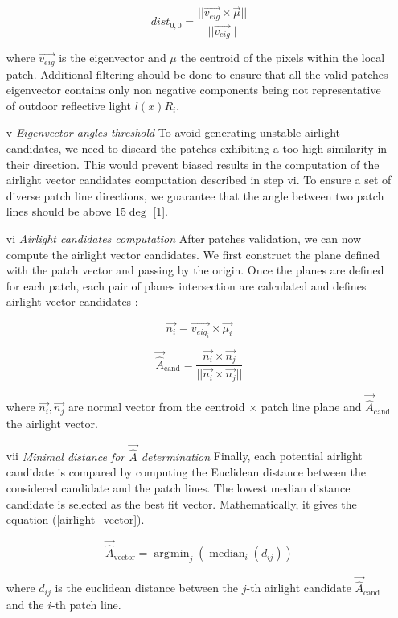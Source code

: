 \documentclass[conference]{IEEEtran}
\DeclareMathOperator*{\argmin}{\arg\!\min}
\begin{document}
\begin{itemize}[]
\begin{equation}
\label{Distance to origin}
dist_{0,0} = \frac{||\vec{v_{eig}} \times \vec{\mu}||}{||\vec{v_{eig}}||}
\end{equation}

where $\vec{v_{eig}}$ is the eigenvector and $\mu$ the centroid of the pixels within the local patch.
Additional filtering should be done to ensure that all the valid patches eigenvector contains only non negative components being 
not representative of outdoor reflective light $l(x)R_i$.

\item[v] \textit{Eigenvector angles threshold} To avoid generating unstable airlight candidates, we need to discard the patches 
exhibiting a too high similarity in their direction. This would prevent biased results in the computation of the airlight vector
 candidates computation described in step vi.  To ensure a set of diverse patch line directions, we guarantee that the angle between two patch lines 
should be above $15 \deg$ [1].
\item[vi] \textit{Airlight candidates computation}  After patches validation, we can now compute the airlight vector candidates.
We first construct the plane defined with the patch vector and passing by the origin.  Once the planes are defined for each patch, each pair of planes 
 intersection are calculated and defines airlight vector candidates :

\begin{equation}
\label{Normal_vector}
\vec{n_i} = \vec{v_{eig_i}} \times \vec{\mu_i}
\end{equation}

\begin{equation}
\label{airlight_candidate}
\vec{\hat{A}}_{\text{cand}} = \frac{\vec{n_i} \times \vec{n_j}}{||\vec{n_i} \times \vec{n_j}||} 
\end{equation}

where $\vec{n_i}, \vec{n_j}$ are normal vector from the {centroid $\times$ patch line} plane and $\vec{\hat{A}}_{\text{cand}}$ the airlight vector.
\item[vii] \textit{Minimal distance for $\vec{\hat{A}}$ determination} Finally, each potential airlight candidate is compared by
computing the Euclidean distance between the considered candidate and the patch lines.  The lowest median distance candidate is selected as
the best fit vector.  Mathematically, it gives the equation (\ref{airlight_vector}).

\begin{equation}
\label{airlight_vector}
\vec{\hat{A}}_{\text{vector}} = \argmin_j(\operatorname{median}_i(d_{ij})) 
\end{equation}

where $d_{ij}$ is the euclidean distance between the $j$-th airlight candidate $\vec{\hat{A}}_{\text{cand}}$ and the $i$-th patch line.
\end{itemize}   
\end{document}
